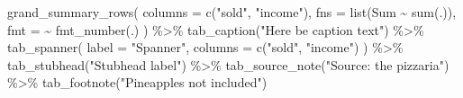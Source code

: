 \documentclass[
  letterpaper,
  DIV=11,
  numbers=noendperiod]{scrartcl}
\newenvironment{Shaded}{\begin{snugshade}}{\end{snugshade}}
\newcommand{\AttributeTok}[1]{\textcolor[rgb]{0.40,0.45,0.13}{#1}}
\newcommand{\FunctionTok}[1]{\textcolor[rgb]{0.28,0.35,0.67}{#1}}
\newcommand{\NormalTok}[1]{\textcolor[rgb]{0.00,0.23,0.31}{#1}}
\newcommand{\SpecialCharTok}[1]{\textcolor[rgb]{0.37,0.37,0.37}{#1}}
\newcommand{\StringTok}[1]{\textcolor[rgb]{0.13,0.47,0.30}{#1}}
\begin{document}
\begin{Shaded}
\begin{Highlighting}[]
  \FunctionTok{grand\_summary\_rows}\NormalTok{(}
    \AttributeTok{columns =} \FunctionTok{c}\NormalTok{(}\StringTok{"sold"}\NormalTok{, }\StringTok{"income"}\NormalTok{),}
    \AttributeTok{fns =} \FunctionTok{list}\NormalTok{(Sum }\SpecialCharTok{\textasciitilde{}} \FunctionTok{sum}\NormalTok{(.)),}
    \AttributeTok{fmt =} \SpecialCharTok{\textasciitilde{}} \FunctionTok{fmt\_number}\NormalTok{(.)}
\NormalTok{  ) }\SpecialCharTok{\%\textgreater{}\%}
  \FunctionTok{tab\_caption}\NormalTok{(}\StringTok{"Here be caption text"}\NormalTok{) }\SpecialCharTok{\%\textgreater{}\%}
  \FunctionTok{tab\_spanner}\NormalTok{(}
    \AttributeTok{label =} \StringTok{"Spanner"}\NormalTok{,}
    \AttributeTok{columns =} \FunctionTok{c}\NormalTok{(}\StringTok{"sold"}\NormalTok{, }\StringTok{"income"}\NormalTok{)}
\NormalTok{  ) }\SpecialCharTok{\%\textgreater{}\%}
  \FunctionTok{tab\_stubhead}\NormalTok{(}\StringTok{"Stubhead label"}\NormalTok{) }\SpecialCharTok{\%\textgreater{}\%}
  \FunctionTok{tab\_source\_note}\NormalTok{(}\StringTok{"Source: the pizzaria"}\NormalTok{) }\SpecialCharTok{\%\textgreater{}\%}
  \FunctionTok{tab\_footnote}\NormalTok{(}\StringTok{"Pineapples not included"}\NormalTok{)}
\end{Highlighting}
\end{Shaded}
\end{document}
